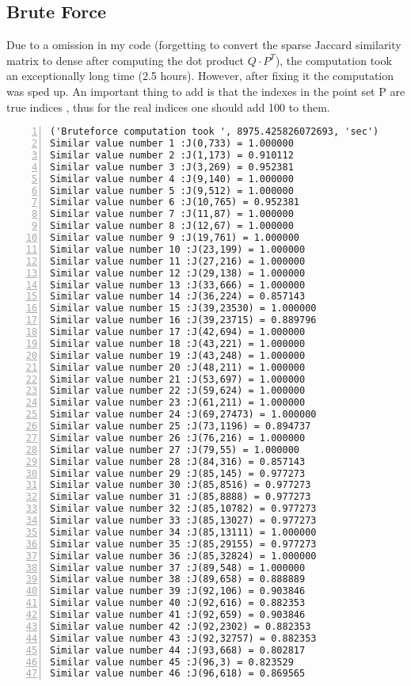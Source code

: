 \subsection{Brute Force}
Due to a omission in my code (forgetting to convert the sparse Jaccard similarity matrix to dense after computing the dot product $Q \cdot P^T$), the computation took an exceptionally long time (2.5 hours). However, after fixing it the computation was sped up. An important thing to add is that the indexes in the point set P are true indices , thus for the real indices one should add 100 to them.

\begin{lstlisting}[language={},numbers=left,numberstyle=\tiny,frame=single,breaklines=true,postbreak=\mbox{\textcolor{red}{$\hookrightarrow$}\space}]
('Bruteforce computation took ', 8975.425826072693, 'sec')
Similar value number 1 :J(0,733) = 1.000000
Similar value number 2 :J(1,173) = 0.910112
Similar value number 3 :J(3,269) = 0.952381
Similar value number 4 :J(9,140) = 1.000000
Similar value number 5 :J(9,512) = 1.000000
Similar value number 6 :J(10,765) = 0.952381
Similar value number 7 :J(11,87) = 1.000000
Similar value number 8 :J(12,67) = 1.000000
Similar value number 9 :J(19,761) = 1.000000
Similar value number 10 :J(23,199) = 1.000000
Similar value number 11 :J(27,216) = 1.000000
Similar value number 12 :J(29,138) = 1.000000
Similar value number 13 :J(33,666) = 1.000000
Similar value number 14 :J(36,224) = 0.857143
Similar value number 15 :J(39,23530) = 1.000000
Similar value number 16 :J(39,23715) = 0.889796
Similar value number 17 :J(42,694) = 1.000000
Similar value number 18 :J(43,221) = 1.000000
Similar value number 19 :J(43,248) = 1.000000
Similar value number 20 :J(48,211) = 1.000000
Similar value number 21 :J(53,697) = 1.000000
Similar value number 22 :J(59,624) = 1.000000
Similar value number 23 :J(61,211) = 1.000000
Similar value number 24 :J(69,27473) = 1.000000
Similar value number 25 :J(73,1196) = 0.894737
Similar value number 26 :J(76,216) = 1.000000
Similar value number 27 :J(79,55) = 1.000000
Similar value number 28 :J(84,316) = 0.857143
Similar value number 29 :J(85,145) = 0.977273
Similar value number 30 :J(85,8516) = 0.977273
Similar value number 31 :J(85,8888) = 0.977273
Similar value number 32 :J(85,10782) = 0.977273
Similar value number 33 :J(85,13027) = 0.977273
Similar value number 34 :J(85,13111) = 1.000000
Similar value number 35 :J(85,29155) = 0.977273
Similar value number 36 :J(85,32824) = 1.000000
Similar value number 37 :J(89,548) = 1.000000
Similar value number 38 :J(89,658) = 0.888889
Similar value number 39 :J(92,106) = 0.903846
Similar value number 40 :J(92,616) = 0.882353
Similar value number 41 :J(92,659) = 0.903846
Similar value number 42 :J(92,2302) = 0.882353
Similar value number 43 :J(92,32757) = 0.882353
Similar value number 44 :J(93,668) = 0.802817
Similar value number 45 :J(96,3) = 0.823529
Similar value number 46 :J(96,618) = 0.869565
\end{lstlisting}

